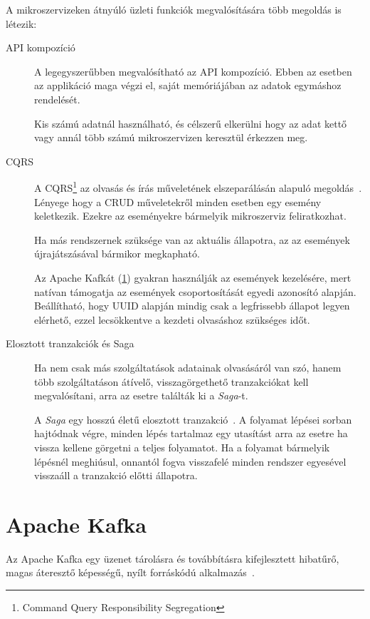 A mikroszervizeken átnyúló üzleti funkciók megvalósítására több megoldás is létezik:
\begin{description}
	\item[API kompozíció] A legegyszerűbben megvalósítható az API kompozíció. Ebben az esetben az applikáció maga végzi el, saját memóriájában az adatok egymáshoz rendelését. 
	
	Kis számú adatnál használható, és célszerű elkerülni hogy az adat kettő vagy annál több számú mikroszervizen keresztül érkezzen meg.
	
	\item[CQRS] A CQRS\footnote{Command Query Responsibility Segregation} az  olvasás és írás műveletének elszeparálásán alapuló megoldás~\cite{OReally_Microservice_Architecture_CQRS}. Lényege hogy a CRUD műveletekről minden esetben egy esemény keletkezik. Ezekre az eseményekre bármelyik mikroszerviz feliratkozhat.
	
	Ha más rendszernek szüksége van az aktuális állapotra, az az események újrajátszásával bármikor megkapható.	
	 
	Az Apache Kafkát (\ref{sec:apache_kafka}) gyakran használják az események kezelésére, mert natívan támogatja az események csoportosítását egyedi azonosító alapján. Beállítható, hogy UUID alapján mindig csak a legfrissebb állapot legyen elérhető, ezzel lecsökkentve a kezdeti olvasáshoz szükséges időt.
		
	\item[Elosztott tranzakciók és Saga] Ha nem csak más szolgáltatások adatainak olvasásáról van szó, hanem több szolgáltatáson átívelő, visszagörgethető tranzakciókat kell megvalósítani, arra az esetre találták ki a \emph{Saga}-t.
	
	A \emph{Saga} egy hosszú életű elosztott tranzakció~\cite{OReally_Microservice_Architecture_Saga}. A folyamat lépései sorban hajtódnak végre, minden lépés tartalmaz egy utasítást arra az esetre ha vissza kellene görgetni a teljes folyamatot. Ha a folyamat bármelyik lépésnél meghiúsul, onnantól fogva visszafelé minden rendszer egyesével visszaáll a tranzakció előtti állapotra.
\end{description}


\section{Apache Kafka}\label{sec:apache_kafka}
Az Apache Kafka egy üzenet tárolásra és továbbításra kifejlesztett hibatűrő, magas áteresztő képességű, nyílt forráskódú alkalmazás~\cite{OReally_Kafka}.

